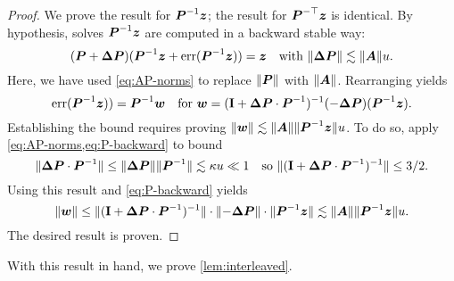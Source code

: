 \documentclass[onefignum,onetabnum,pagebackref,dvipsnames]{siamart220329}
\begin{document}
\begin{proof}
    We prove the result for $\boldsymbol{P}^{-1}\boldsymbol{z}$; the result for $\boldsymbol{P}^{-\top}\boldsymbol{z}$ is identical.
    By hypothesis, solves $\boldsymbol{P}^{-1}\boldsymbol{z}$ are computed in a backward stable way:
    \begin{equation} \label{eq:P-backward}
        (\mat{P} + \mat{\Delta P})(\mat{P}^{-1}\vec{z} + \err(\mat{P}^{-1}\vec{z})) = \vec{z} \quad \text{with } \norm{\mat{\Delta P}} \lesssim \norm{\mat{A}}u.
    \end{equation}
    Here, we have used \cref{eq:AP-norms} to replace $\norm{\mat{P}}$ with $\norm{\mat{A}}$.
    Rearranging yields
    \begin{equation*}
        \operatorname{err}(\boldsymbol{P}^{-1}\boldsymbol{z})) = \boldsymbol{P}^{-1}\boldsymbol{w} \quad \text{for } \boldsymbol{w} = (\mathbf{I} + \boldsymbol{\Delta P}\cdot \boldsymbol{P}^{-1})^{-1} (-\boldsymbol{\Delta P}) (\boldsymbol{P}^{-1}\boldsymbol{z}).
    \end{equation*}
    Establishing the bound requires proving $\norm{\vec{w}} \lesssim \norm{\mat{A}}\norm{\smash{\mat{P}^{-1}\vec{z}}}u$.
    To do so, apply \cref{eq:AP-norms,eq:P-backward} to bound
    \begin{equation*}
        \norm{\smash{\mat{\Delta P} \cdot \mat{P}^{-1}}} \le \norm{\mat{\Delta P}}\norm{\smash{\mat{P}^{-1}}} \lesssim \kappa u \ll 1 \quad \text{so } \norm{\smash{(\Id + \mat{\Delta P}\cdot \mat{P}^{-1})^{-1}}} \le 3/2.
    \end{equation*}
    Using this result and \cref{eq:P-backward} yields
    \begin{equation*}
        \norm{\vec{w}} \le \norm{\smash{(\Id + \mat{\Delta P}\cdot \mat{P}^{-1})^{-1}}} \cdot \norm{-\mat{\Delta P}} \cdot \norm{\smash{\mat{P}^{-1}\vec{z}}} \lesssim \norm{\mat{A}}\norm{\smash{\mat{P}^{-1}\vec{z}}}u.
    \end{equation*}
    The desired result is proven.
\end{proof}

With this result in hand, we prove \cref{lem:interleaved}.
\end{document}
